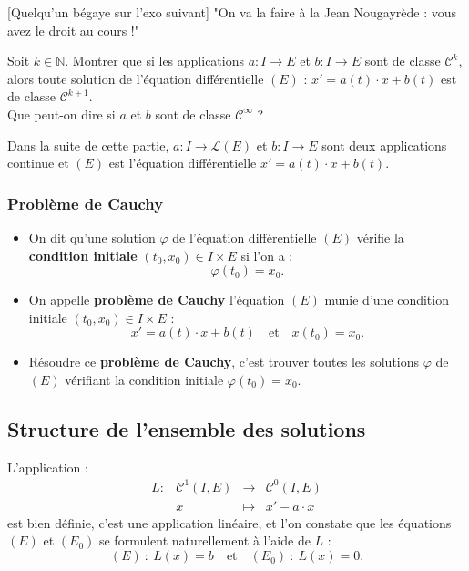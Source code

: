 \documentclass[french]{article}
\newcommand{\N}{\mathbb{N}}
\theoremstyle{plain}
\theoremstyle{definition}
\theoremstyle{remark}
\begin{document}
[Quelqu'un bégaye sur l'exo suivant] "On va la faire à la Jean Nougayrède : vous avez le droit au cours !"

\begin{exo}
	Soit $k\in\N$. Montrer que si les applications $a:I\to E$ et $b:I\to E$ sont de classe $\mathcal{C}^k$, alors toute solution de l'équation différentielle $(E)$ : $x'=a(t)\cdot x+b(t)$ est de classe $\mathcal{C}^{k+1}$.\\
	Que peut-on dire si $a$ et $b$ sont de classe $\mathcal{C}^\infty$ ?
\end{exo}

Dans la suite de cette partie, $a:I\to\mathcal{L}(E)$ et $b:I\to E$ sont deux applications continue et $(E)$ est l'équation différentielle $x'=a(t)\cdot x+b(t)$.

\subsubsection*{Problème de Cauchy}

\begin{dfn}
	\begin{itemize}
		\item On dit qu'une solution $\varphi$ de l'équation différentielle $(E)$ vérifie la \textbf{condition initiale} $(t_0,x_0)\in I\times E$ si l'on a :
		$$\varphi(t_0)=x_0.$$
		\item On appelle \textbf{problème de Cauchy} l'équation $(E)$ munie d'une condition initiale $(t_0,x_0)\in I\times E$ :
		$$x'=a(t)\cdot x+b(t)\quad\text{et}\quad x(t_0)=x_0.$$
		\item Résoudre ce \textbf{problème de Cauchy}, c'est trouver toutes les solutions $\varphi$ de $(E)$ vérifiant la condition initiale $\varphi(t_0)=x_0$.
	\end{itemize}
\end{dfn}

\subsection{Structure de l'ensemble des solutions}

L'application  :
$$\begin{array}{lrcl}
	L:&\mathcal{C}^1(I,E)&\longrightarrow&\mathcal{C}^0(I,E)\\
	&x&\longmapsto&x'-a\cdot x
\end{array}$$ est bien définie, c'est une application linéaire, et l'on constate que les équations $(E)$ et $(E_0)$ se formulent naturellement à l'aide de $L$ :
$$(E)\ :\ L(x)=b\quad\text{et}\quad (E_0)\ :\ L(x)=0.$$
\end{document}
